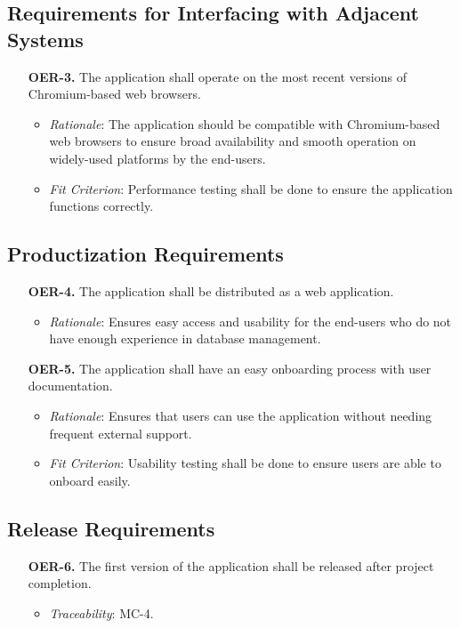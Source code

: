 \documentclass[12pt]{article}
\begin{document}
\subsection{Requirements for Interfacing with Adjacent Systems}
\begin{enumerate}
  \item[\textbf{OER-3.}] The application shall operate on the most recent versions of Chromium-based web browsers.
    \begin{itemize}
      \item \textit{Rationale}: The application should be compatible with Chromium-based web browsers to ensure broad availability and smooth operation on widely-used platforms by the end-users.
      \item \textit{Fit Criterion}: Performance testing shall be done to ensure the application functions correctly.
    \end{itemize}
\end{enumerate}

\subsection{Productization Requirements}
\begin{enumerate}
  \item[\textbf{OER-4.}] The application shall be distributed as a web application.
    \begin{itemize}
      \item \textit{Rationale}: Ensures easy access and usability for the end-users who do not have enough experience in database management.
    \end{itemize}
  \item[\textbf{OER-5.}] The application shall have an easy onboarding process with user documentation.
    \begin{itemize}
      \item \textit{Rationale}: Ensures that users can use the application without needing frequent external support.
      \item \textit{Fit Criterion}: Usability testing shall be done to ensure users are able to onboard easily.
    \end{itemize}
\end{enumerate}

\subsection{Release Requirements}
\begin{enumerate}
  \item[\textbf{OER-6.}] The first version of the application shall be released after project completion.
    \begin{itemize}
      \item \textit{Traceability}: MC-4.
    \end{itemize}
\end{enumerate}
\end{document}

